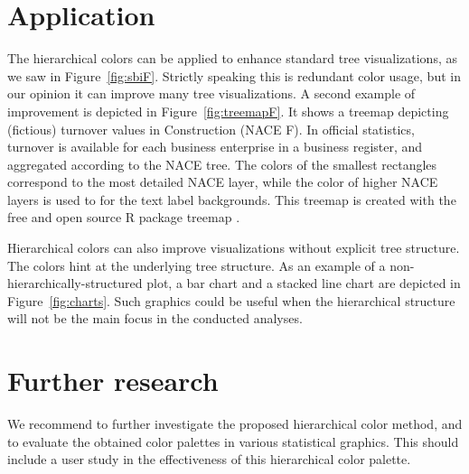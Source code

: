 \documentclass[review]{vgtc}                 %
\begin{document}
\section{Application}
The hierarchical colors can be applied to enhance standard tree visualizations, as we saw in Figure~\ref{fig:sbiF}. Strictly speaking this is redundant color usage, but in our opinion it can improve many tree visualizations. A second example of improvement is depicted in Figure~\ref{fig:treemapF}. It shows a treemap depicting (fictious) turnover values in Construction (NACE F). In official statistics, turnover is available for each business enterprise in a business register, and aggregated according to the NACE tree. The colors of the smallest rectangles correspond to the most detailed NACE layer, while the color of higher NACE layers is used to for the text label backgrounds. This treemap is created with the free and open source R package treemap \cite{treemap}.

Hierarchical colors can also improve visualizations without explicit tree structure. The colors hint at the underlying tree structure.
As an example of a non-hierarchically-structured plot, a bar chart and a stacked line chart are depicted in Figure~\ref{fig:charts}. Such graphics could be useful when the hierarchical structure will not be the main focus in the conducted analyses.

\section{Further research}

We recommend to further investigate the proposed hierarchical color method, and to evaluate the obtained color palettes in various statistical graphics. This should include a user study in the effectiveness of this hierarchical color palette.




\end{document}
